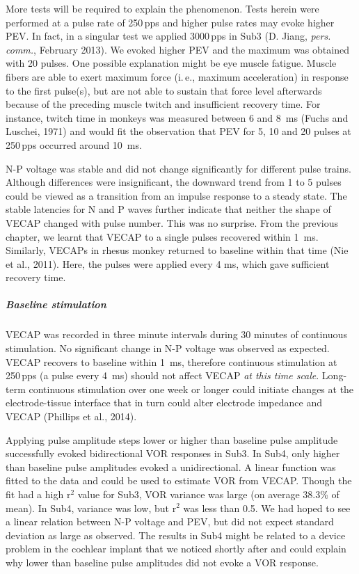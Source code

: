 More tests will be required to explain the phenomenon. Tests herein were performed at a pulse rate of 250\,pps and higher pulse rates may evoke higher PEV. In fact, in a singular test we applied 3000\,pps in Sub3 (D. Jiang, \textit{pers. comm.}, February 2013). We evoked higher PEV and the maximum was obtained with 20 pulses. One possible explanation might be eye muscle fatigue. Muscle fibers are able to exert maximum force (i.\,e., maximum acceleration) in response to the first pulse(s), but are not able to sustain that force level afterwards because of the preceding muscle twitch and insufficient recovery time. For instance, twitch time in monkeys was measured between 6 and \SI{8}{\milli\second} (Fuchs and Luschei, 1971) and would fit the observation that PEV for 5, 10 and 20 pulses at 250\,pps occurred around \SI{10}{\milli\second}.

N-P voltage was stable and did not change significantly for different pulse trains. Although differences were insignificant, the downward trend from 1 to 5 pulses could be viewed as a transition from an impulse response to a steady state. The stable latencies for N and P waves further indicate that neither the shape of VECAP changed with pulse number. This was no surprise. From the previous chapter, we learnt that VECAP to a single pulses recovered within \SI{1}{\milli\second}. Similarly, VECAPs in rhesus monkey returned to baseline within that time (Nie et al., 2011). Here, the pulses were applied every 4 ms, which gave sufficient recovery time.

\subparagraph{Baseline stimulation}
VECAP was recorded in three minute intervals during 30 minutes of continuous stimulation. No significant change in N-P voltage was observed as expected. VECAP recovers to baseline within \SI{1}{\milli\second}, therefore continuous stimulation at 250\,pps (a pulse every \SI{4}{\milli\second}) should not affect VECAP \emph{at this time scale}. Long-term continuous stimulation over one week or longer could initiate changes at the electrode-tissue interface that in turn could alter electrode impedance and VECAP (Phillips et al., 2014).

Applying pulse amplitude steps lower or higher than baseline pulse amplitude successfully evoked bidirectional VOR responses in Sub3. In Sub4, only higher than baseline pulse amplitudes evoked a unidirectional. A linear function was fitted to the data and could be used to estimate VOR from VECAP. Though the fit had a high r$^2$ value for Sub3, VOR variance was large (on average 38.3\% of mean). In Sub4, variance was low, but r$^2$ was less than 0.5. We had hoped to see a linear relation between N-P voltage and PEV, but did not expect standard deviation as large as observed. The results in Sub4 might be related to a device problem in the cochlear implant that we noticed shortly after and could explain why lower than baseline pulse amplitudes did not evoke a VOR response. 

